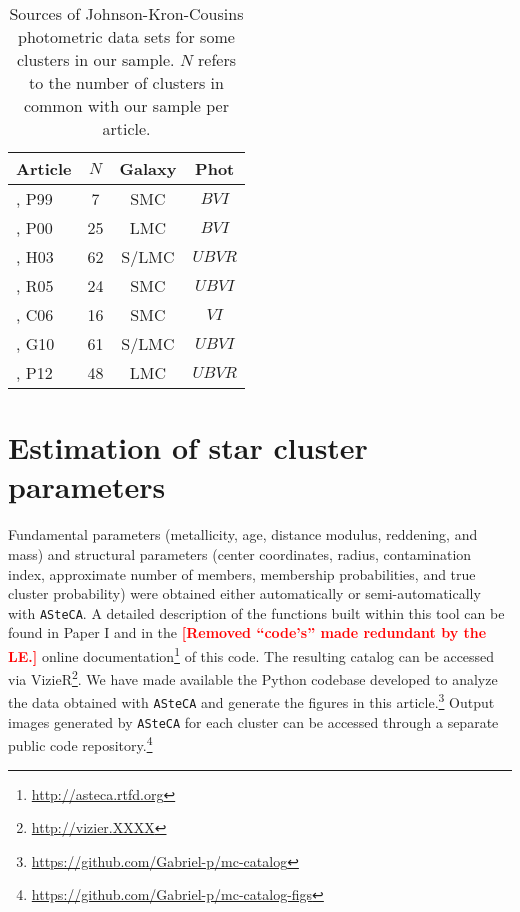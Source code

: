 \documentclass[draft]{aa}
\newcommand{\LEt}[1]{\textcolor{red}{\textbf{[#1]}}}
\begin{document}
\begin{table}
\centering
  \caption{Sources of Johnson-Kron-Cousins photometric data sets for some
  clusters in our sample. $N$ refers to the number of clusters in common with
  our sample per article.}
\label{tab:databases}
 \begin{tabular}{l c c c}
\hline\hline
Article & $N$ & Galaxy & Phot\\
\hline
\cite{Pietrzynski1999}, P99 & 7 & SMC & $BVI$ \\ 
\cite{Pietrzynski2000}, P00 & 25 & LMC & $BVI$ \\ 
\cite{Hunter_2003}, H03 & 62 & S/LMC & $UBVR$ \\ 
\cite{Rafelski_2005}, R05 & 24 & SMC & $UBVI$ \\ 
\cite{Chiosi_2006}, C06 & 16 & SMC & $VI$ \\ 
\cite{Glatt_2010}, G10 & 61 & S/LMC & $UBVI$ \\ 
\cite{Popescu_2012}, P12 & 48 & LMC & $UBVR$ \\ 
\hline
 \end{tabular} 
\end{table}
  




\section{Estimation of star cluster parameters}
\label{sec:fund-params}

Fundamental parameters (metallicity, age, distance modulus, reddening, and mass)
and structural parameters (center coordinates, radius, contamination index,
approximate number of members, membership probabilities, and true cluster
probability) were obtained either automatically or semi-automatically with
\texttt{ASteCA}.
%
A detailed description of the functions built within this tool can be found in
Paper I and in the \LEt{Removed ``code's'' made redundant by the LE.} online
documentation\footnote{\url{http://asteca.rtfd.org}} of this code.
%
The resulting catalog can be accessed via
VizieR\footnote{\url{http://vizier.XXXX}}.
We have made available the Python codebase developed to analyze
the data obtained with \texttt{ASteCA} and generate the figures in this
article.\footnote{\url{https://github.com/Gabriel-p/mc-catalog}}
%
Output images generated by \texttt{ASteCA} for each cluster can be
accessed through a separate public code
repository.\footnote{\url{https://github.com/Gabriel-p/mc-catalog-figs}}
\end{document}
